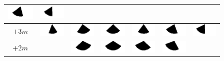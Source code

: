 \begin{figure}
\begin{tabular}{|c|c|c|c|c|c|c|}
		\includegraphics[width=1.4cm]{PosWinkelVideo/Winkel_V_-200_400.png}&
		\includegraphics[width=1.4cm]{PosWinkelVideo/Winkel_V_-300_400.png}\\ 
		\hline 
		$+3m$ &
		\includegraphics[width=1.4cm]{PosWinkelVideo/Winkel_V_200_300.png}&
		\includegraphics[width=1.4cm]{PosWinkelVideo/Winkel_V_100_300.png}&
		\includegraphics[width=1.4cm]{PosWinkelVideo/Winkel_V_0_300.png}&
		\includegraphics[width=1.4cm]{PosWinkelVideo/Winkel_V_-100_300.png}&
		\includegraphics[width=1.4cm]{PosWinkelVideo/Winkel_V_-200_300.png}&
		\includegraphics[width=1.4cm]{PosWinkelVideo/Winkel_V_-300_300.png}\\ 
		\hline 
		$+2m$ & &
		\includegraphics[width=1.4cm]{PosWinkelVideo/Winkel_V_100_200.png}&
		\includegraphics[width=1.4cm]{PosWinkelVideo/Winkel_V_0_200.png}&
		\includegraphics[width=1.4cm]{PosWinkelVideo/Winkel_V_-100_200.png}&
		\includegraphics[width=1.4cm]{PosWinkelVideo/Winkel_V_-200_200.png} &\\ 

\end{tabular}
\end{figure}
